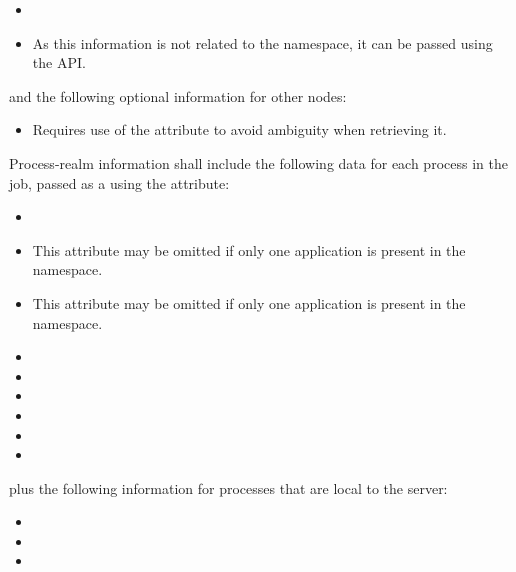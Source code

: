 \begin{itemize}
    \item {}
    \item {}As this information is not related to the namespace, it can be passed using the  \ac{API}.
    \pasteAttributeItemEnd
\end{itemize}

and the following optional information for other nodes:

\begin{itemize}
    \item {}Requires use of the  attribute to avoid ambiguity when retrieving it.
    \pasteAttributeItemEnd
\end{itemize}

Process-realm information shall include the following data for each process in the job, passed as a  using the  attribute:

\begin{itemize}
    \item {}
    \item {}This attribute may be omitted if only one application is present in the namespace.
    \pasteAttributeItemEnd
    \item {}This attribute may be omitted if only one application is present in the namespace.
    \pasteAttributeItemEnd
    \item {}
    \item {}
    \item {}
    \item {}
    \item {}
    \item {}
\end{itemize}

plus the following information for processes that are local to the server:

\begin{itemize}
    \item {}
    \item {}
    \item {}
\end{itemize}

